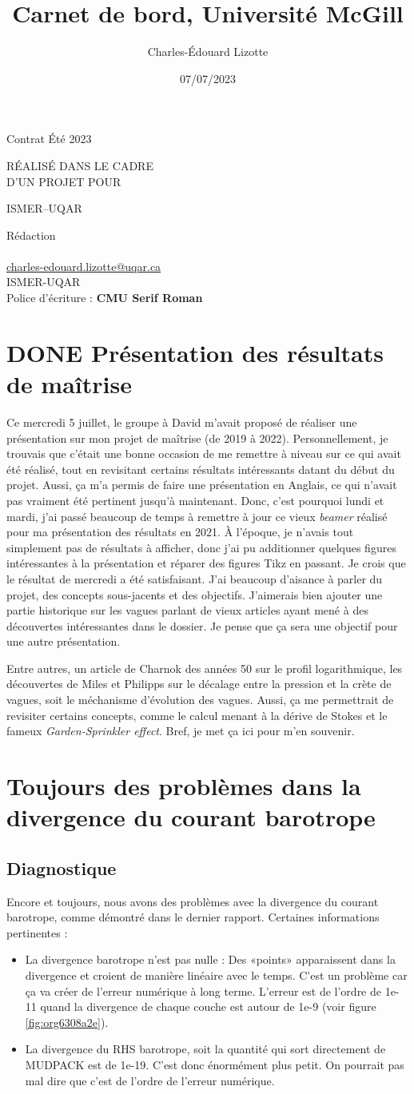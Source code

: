 \documentclass[10pt]{article}
\author{Charles-Édouard Lizotte}
\date{07/07/2023}
\title{Carnet de bord, Université McGill}
\makeatletter
\numberwithin{equation}{section}
\newcommand{\mytitlepage}{
\begin{titlepage}
\begin{center}
{\Huge \thesubtitle \par}
\vspace{2cm}
{\Huge \MakeUppercase{\thetitle} \par}
\vspace{2cm}
RÉALISÉ DANS LE CADRE\\ D'UN PROJET POUR \par
\vspace{2cm}
{\Huge ISMER--UQAR \par}
\vspace{2cm}
{\thedate}
\end{center}
\vfill
Rédaction \\
{\theauthor}\\
\url{charles-edouard.lizotte@uqar.ca}\\
ISMER-UQAR\\
Police d'écriture : \textbf{CMU Serif Roman}
\end{titlepage}
}
\newcommand{\thesubtitle}{Contrat Été 2023}
\makeatother
\begin{document}
\mytitlepage
\tableofcontents\newpage
\section{{\bfseries\sffamily DONE} Présentation des résultats de maîtrise}
\label{sec:org2b633c3}
Ce mercredi 5 juillet, le groupe à David m'avait proposé de réaliser une présentation sur mon projet de maîtrise (de 2019 à 2022).
Personnellement, je trouvais que c'était une bonne occasion de me remettre à niveau sur ce qui avait été réalisé, tout en revisitant certains résultats intéressants datant du début du projet.
Aussi, ça m'a permis de faire une présentation en Anglais, ce qui n'avait pas vraiment été pertinent jusqu'à maintenant.
Donc, c'est pourquoi lundi et mardi, j'ai passé beaucoup de temps à remettre à jour ce vieux \emph{beamer} réalisé pour ma présentation des résultats en 2021.
À l'époque, je n'avais tout simplement pas de résultats à afficher, donc j'ai pu additionner quelques figures intéressantes à la présentation et réparer des figures Tikz en passant.
Je crois que le résultat de mercredi a été satisfaisant.
J'ai beaucoup d'aisance à parler du projet, des concepts sous-jacents et des objectifs.
J'aimerais bien ajouter une partie historique sur les vagues parlant de vieux articles ayant mené à des découvertes intéressantes dans le dossier.
Je pense que ça sera une objectif pour une autre présentation.\bigskip

Entre autres, un article de Charnok des années 50 sur le profil logarithmique, les découvertes de Miles et Philipps sur le décalage entre la pression et la crète de vagues, soit le méchanisme d'évolution des vagues.
Aussi, ça me permettrait de revisiter certains concepts, comme le calcul menant à la dérive de Stokes et le fameux \emph{Garden-Sprinkler effect}.
Bref, je met ça ici pour m'en souvenir.
\section{Toujours des problèmes dans la divergence du courant barotrope}
\label{sec:org3230894}

\subsection{Diagnostique}
\label{sec:orgfba4a65}
Encore et toujours, nous avons des problèmes avec la divergence du courant barotrope, comme démontré dans le dernier rapport.
Certaines informations pertinentes :
\begin{itemize}
\item La divergence barotrope n'est pas nulle : Des «points» apparaissent dans la divergence et croient de manière linéaire avec le temps. C'est un problème car ça va créer de l'erreur numérique à long terme. L'erreur est de l'ordre de 1e-11 quand la divergence de chaque couche est autour de 1e-9 (voir figure \ref{fig:org6308a2e}).
\item La divergence du RHS barotrope, soit la quantité qui sort directement de MUDPACK est de 1e-19. C'est donc énormément plus petit. On pourrait pas mal dire que c'est de l'ordre de l'erreur numérique.
\end{itemize}
\end{document}
